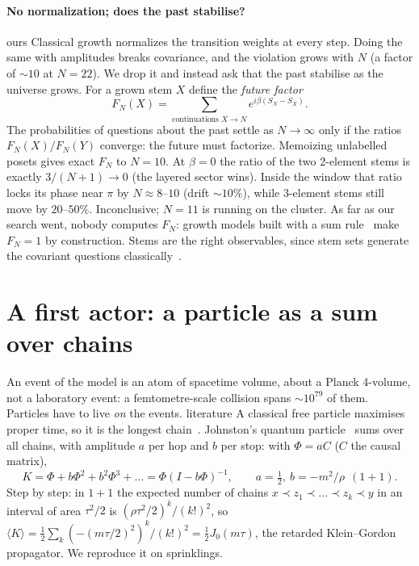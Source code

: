 \documentclass[11pt,a4paper]{article}
\newcommand{\tagbox}[2]{\textsf{\scriptsize\colorbox{#1!12}{\textcolor{#1!70!black}{#2}}}}
\newcommand{\lit}{\tagbox{blue}{literature}}
\newcommand{\ours}{\tagbox{orange}{ours}}
\begin{document}
\paragraph{No normalization; does the past stabilise?} \ours{} Classical growth normalizes the transition weights at every step. Doing the same with amplitudes breaks covariance, and the violation grows with $N$ (a factor of $\sim10$ at $N=22$). We drop it and instead ask that the past stabilise as the universe grows. For a grown stem $X$ define the \emph{future factor}
\begin{equation}
F_N(X)=\sum_{\text{continuations }X\to N}e^{i\beta(S_N-S_X)} .
\end{equation}
The probabilities of questions about the past settle as $N\to\infty$ only if the ratios $F_N(X)/F_N(Y)$ converge: the future must factorize. Memoizing unlabelled posets gives exact $F_N$ to $N=10$. At $\beta=0$ the ratio of the two 2-element stems is exactly $3/(N+1)\to0$ (the layered sector wins). Inside the window that ratio locks its phase near $\pi$ by $N\approx8$--$10$ (drift $\sim10\%$), while 3-element stems still move by $20$--$50\%$. Inconclusive; $N=11$ is running on the cluster. As far as our search went, nobody computes $F_N$: growth models built with a sum rule~\cite{SuryaZalel20} make $F_N=1$ by construction. Stems are the right observables, since stem sets generate the covariant questions classically~\cite{BDGHS03}.

\section{A first actor: a particle as a sum over chains}\label{sec:matter}
An event of the model is an atom of spacetime volume, about a Planck 4-volume, not a laboratory event: a femtometre-scale collision spans $\sim10^{79}$ of them. Particles have to live \emph{on} the events. \lit{} A classical free particle maximises proper time, so it is the longest chain~\cite{BrightwellGregory91}. Johnston's quantum particle~\cite{Johnston08} sums over all chains, with amplitude $a$ per hop and $b$ per stop: with $\Phi=aC$ ($C$ the causal matrix),
\begin{equation}
K=\Phi+b\Phi^2+b^2\Phi^3+\dots=\Phi(I-b\Phi)^{-1},\qquad a=\tfrac12,\ b=-m^2/\rho\ \ (1+1).
\end{equation}
Step by step: in $1+1$ the expected number of chains $x\prec z_1\prec\dots\prec z_k\prec y$ in an interval of area $\tau^2/2$ is $(\rho\tau^2/2)^k/(k!)^2$, so $\langle K\rangle=\tfrac12\sum_k(-(m\tau/2)^2)^k/(k!)^2=\tfrac12J_0(m\tau)$, the retarded Klein--Gordon propagator. We reproduce it on sprinklings.
\end{document}
